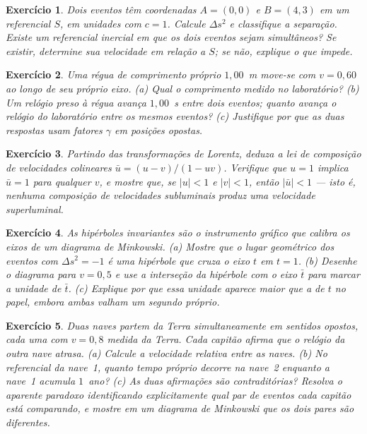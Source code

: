 \documentclass[12pt,a4paper,oneside]{book}
\theoremstyle{rgplain}
\newtheorem{exercise}{Exercício}[chapter]
\theoremstyle{rgremark}
\begin{document}
\begin{exercise}
Dois eventos têm coordenadas $A=(0,0)$ e $B=(4,3)$ em um referencial $S$, em
unidades com $c=1$. Calcule $\Delta s^2$ e classifique a separação. Existe um
referencial inercial em que os dois eventos sejam simultâneos? Se existir,
determine sua velocidade em relação a $S$; se não, explique o que impede.
\end{exercise}

\begin{exercise}
Uma régua de comprimento próprio $1{,}00$~m move-se com $v=0{,}60$ ao longo de
seu próprio eixo. (a) Qual o comprimento medido no laboratório? (b) Um relógio
preso à régua avança $1{,}00$~s entre dois eventos; quanto avança o relógio do
laboratório entre os mesmos eventos? (c) Justifique por que as duas respostas
usam fatores $\gamma$ em posições opostas.
\end{exercise}

\begin{exercise}
Partindo das transformações de Lorentz, deduza a lei de composição de
velocidades colineares $\bar u=(u-v)/(1-uv)$. Verifique que $u=1$ implica $\bar u=1$
para qualquer $v$, e mostre que, se $|u|<1$ e $|v|<1$, então $|\bar u|<1$ --- isto
é, nenhuma composição de velocidades subluminais produz uma velocidade
superluminal.
\end{exercise}

\begin{exercise}
As hipérboles invariantes são o instrumento gráfico que calibra os eixos de um
diagrama de Minkowski. (a) Mostre que o lugar geométrico dos eventos com
$\Delta s^2=-1$ é uma hipérbole que cruza o eixo $t$ em $t=1$. (b) Desenhe o
diagrama para $v=0{,}5$ e use a interseção da hipérbole com o eixo $\bar t$ para
marcar a unidade de $\bar t$. (c) Explique por que essa unidade aparece
\emph{maior} que a de $t$ no papel, embora ambas valham um segundo próprio.
\end{exercise}

\begin{exercise}
Duas naves partem da Terra simultaneamente em sentidos opostos, cada uma com
$v=0{,}8$ medida da Terra. Cada capitão afirma que o relógio da outra nave
atrasa. (a) Calcule a velocidade relativa entre as naves. (b) No referencial
da nave~1, quanto tempo próprio decorre na nave~2 enquanto a nave~1 acumula
$1$~ano? (c) As duas afirmações são contraditórias? Resolva o aparente
paradoxo identificando explicitamente qual par de eventos cada capitão está
comparando, e mostre em um diagrama de Minkowski que os dois pares são
diferentes.
\end{exercise}
\end{document}

